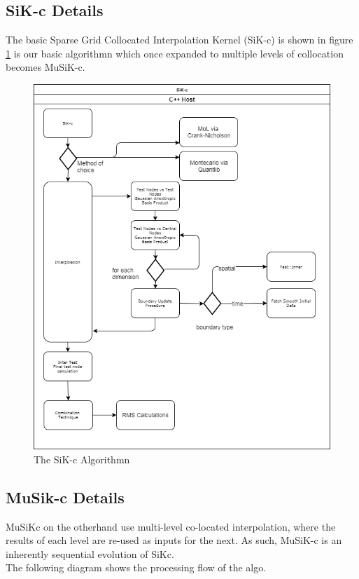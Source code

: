 \documentclass[a4paper]{amsart}
\begin{document}
\subsection{SiK-c Details} \label{appSiK}
The basic Sparse Grid Collocated Interpolation Kernel (SiK-c) is shown in figure \ref{fig:sikc1} is our basic algorithmn which once expanded to multiple levels of collocation becomes MuSiK-c.

\begin{figure}[h]
\centering
\includegraphics[scale=0.5]{SiKc1.png}
\caption {The SiK-c Algorithmn}
\label {fig:sikc1}
\end{figure}


\newpage
\subsection{MuSik-c Details} \label{appMuSiK}
MuSiKc on the otherhand use multi-level co-located interpolation, where the results of each level are re-used as inputs for the next. As such, MuSiK-c is an inherently sequential evolution of SiKc.\\
 The following diagram shows the processing flow of the algo.\\
\end{document}
